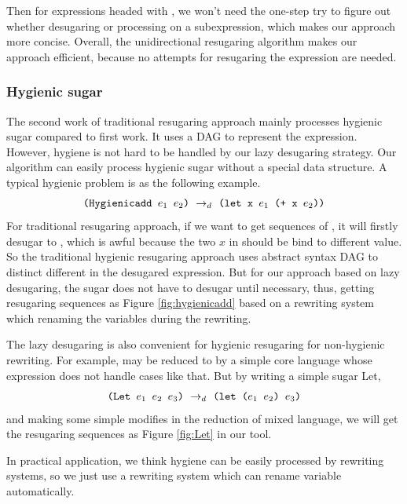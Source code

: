 Then for expressions headed with , we won't need the one-step try to figure out whether desugaring or processing on a subexpression, which makes our approach more concise. Overall, the unidirectional resugaring algorithm makes our approach efficient, because no attempts for resugaring the expression are needed.
\subsubsection{Hygienic sugar}
\label{mark:hygienic}


The second work\cite{hygienic} of traditional resugaring approach mainly processes hygienic sugar compared to first work. It uses a DAG to represent the expression. However, hygiene is not hard to be handled by our lazy desugaring strategy. Our algorithm can easily process hygienic sugar without a special data structure.
A typical hygienic problem is as the following example.
\[
\texttt{(Hygienicadd $e_1$ $e_2$)} ~\rightarrow_d~ \texttt{(let x $e_1$ (+ x $e_2$))}
\]
For traditional resugaring approach, if we want to get sequences of , it will firstly desugar to , which is awful because the two $x$ in  should be bind to different value. So the traditional hygienic resugaring approach uses abstract syntax DAG to distinct different  in the desugared expression. But for our approach based on lazy desugaring, the  sugar does not have to desugar until necessary, thus, getting resugaring sequences as Figure \ref{fig:hygienicadd} based on a  rewriting system which renaming the variables during the rewriting.


The lazy desugaring is also convenient for hygienic resugaring for non-hygienic rewriting. For example,  may be reduced to  by a simple core language whose  expression does not handle cases like that. But by writing a simple sugar Let,
\[\texttt{(Let~$e_1$~$e_2$~$e_3$)} ~\rightarrow_d~ \texttt{(let~($e_1$~$e_2$)~$e_3$)}\]
and making some simple modifies in the reduction of mixed language, we will get the resugaring sequences as Figure \ref{fig:Let} in our tool.


In practical application, we think hygiene can be easily processed by rewriting systems, so we just use a rewriting system which can rename variable automatically.

